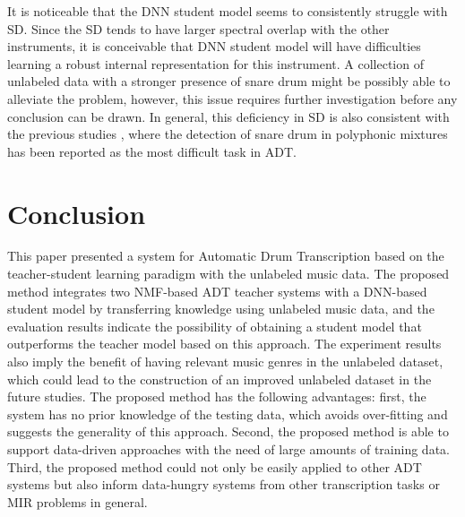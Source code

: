 \documentclass{article}
\begin{document}
It is noticeable that the DNN student model seems to consistently struggle with SD. Since the SD tends to have larger spectral overlap with the other instruments, it is conceivable that DNN student model will have difficulties learning a robust internal representation for this instrument. A collection of unlabeled data with a stronger presence of snare drum might be possibly able to alleviate the problem, however, this issue requires further investigation before any conclusion can be drawn. In general, this deficiency in SD is also consistent with the previous studies \cite{Paulus2009a, Wu2015a, Southall2016, Vogl2016}, where the detection of snare drum in polyphonic mixtures has been reported as the most difficult task in ADT. %

\section{Conclusion}\label{sec:conclusion}
This paper presented a system for Automatic Drum Transcription based on the teacher-student learning paradigm with the unlabeled music data. The proposed method integrates two NMF-based ADT teacher systems with a DNN-based student model by transferring knowledge using unlabeled music data, and the evaluation results indicate the possibility of obtaining a student model that outperforms the teacher model based on this approach. The experiment results also imply the benefit of having relevant music genres in the unlabeled dataset, which could lead to the construction of an improved unlabeled dataset in the future studies. The proposed method has the following advantages: first, the system has no prior knowledge of the testing data, which avoids over-fitting and suggests the generality of this approach. Second, the proposed method is able to support data-driven approaches with the need of large amounts of training data. Third, the proposed method could not only be easily applied to other ADT systems but also inform data-hungry systems from other transcription tasks or MIR problems in general.
\end{document}
